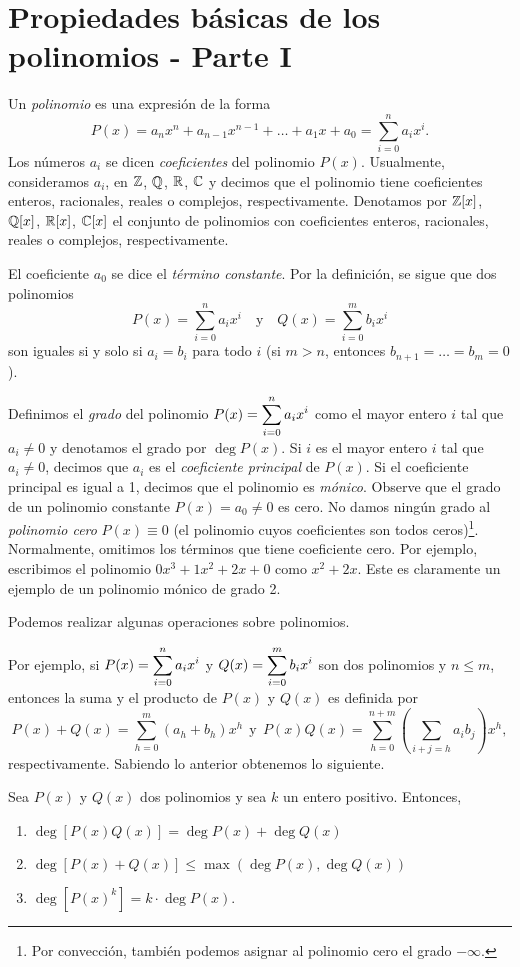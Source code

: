 \chapter[Propiedades básicas. Primera parte]{Propiedades básicas de los polinomios - Parte I}

Un \textit{polinomio} es una expresión de la forma
\[
    P(x) = a_n x^n + a_{n - 1} x^{n - 1} + \ldots + a_1 x + a_0 = \sum_{i = 0}^{n} a_i x^i.
\]
Los números $a_i$ se dicen \textit{coeficientes} del polinomio $P(x)$.
Usualmente, consideramos $a_i$, en $\mathbb{Z}$, $\mathbb{Q}$, $\mathbb{R}$, $\mathbb{C}$ y decimos que el polinomio tiene coeficientes enteros, racionales, reales o complejos, respectivamente.
Denotamos por $\mathbb{Z}[x]$, $\mathbb{Q}[x]$, $\mathbb{R}[x]$, $\mathbb{C}[x]$ el conjunto de polinomios con coeficientes enteros, racionales, reales o complejos, respectivamente.

El coeficiente $a_0$ se dice el \textit{término constante}.
Por la definición, se sigue que dos polinomios
\[
    P(x) = \sum_{i = 0}^{n} a_i x^i \quad \text{y} \quad Q(x) = \sum_{i = 0}^{m} b_i x^i
\]
son iguales si y solo si $a_i = b_i$ para todo $i$ (si $m > n$, entonces $b_{n + 1} = \ldots = b_m = 0$).

Definimos el \textit{grado} del polinomio $P(x) = \displaystyle \sum_{i = 0}^{n} a_i x^i $ como el mayor entero $i$ tal que $a_i \neq 0$ y denotamos el grado por $\deg P(x)$.
Si $i$ es el mayor entero $i$ tal que $a_i \neq 0$, decimos que $a_i$ es el \textit{coeficiente principal} de $P(x)$.
Si el coeficiente principal es igual a 1, decimos que el polinomio es \textit{mónico}.
Observe que el grado de un polinomio constante $P(x) = a_0 \neq 0$ es cero.
No damos ningún grado al \textit{polinomio cero} $P(x) \equiv 0$ (\ie el polinomio cuyos coeficientes son todos ceros)\footnote{Por convección, también podemos asignar al polinomio cero el grado $- \infty$.}.
Normalmente, omitimos los términos que tiene coeficiente cero.
Por ejemplo, escribimos el polinomio $0x^3 + 1x^2 + 2x + 0$ como $x^2 + 2x$.
Este es claramente un ejemplo de un polinomio mónico de grado 2.

Podemos realizar algunas operaciones sobre polinomios.

Por ejemplo, si $P(x) = \displaystyle \sum_{i = 0}^{n} a_i x^i$ y $Q(x) = \displaystyle \sum_{i = 0}^{m} b_i x^i $ son dos polinomios y $n \leq m$, entonces la suma y el producto de $P(x)$ y $Q(x)$ es definida por
\[
    P(x) + Q(x) = \sum_{h = 0}^{m} (a_h + b_h) x^h \ \ \text{y} \ \ P(x)Q(x) = \sum_{h = 0}^{n + m} \left(\sum_{i + j = h} a_i b_j \right)x^h,
\]
respectivamente.
Sabiendo lo anterior obtenemos lo siguiente.
\begin{theorem}{}{}
    Sea $P(x)$ y $Q(x)$ dos polinomios y sea $k$ un entero positivo.
    Entonces,
    \begin{enumerate}
        \item $\deg [P(x) Q(x)] = \deg P(x) + \deg Q(x)$
        \item $\deg [P(x) + Q(x)] \leq \max (\deg P(x), \deg Q(x))$
        \item $\deg [P(x)^k] = k \cdot \deg P(x)$.
    \end{enumerate}
\end{theorem}





